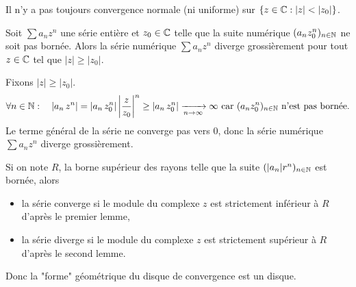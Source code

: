 \documentclass{book}
\begin{document}
\begin{Remarque} Il n'y a pas toujours convergence normale (ni uniforme) sur $\{z\in \C:|z|<|z_0|\}$.
\end{Remarque}
\begin{Lemme}
Soit $\sum a_n z^n$ une série entière et $z_0\in \mathbb{C}$ telle que la suite numérique $(a_n z_0^n)_{n\in \mathbb{N} }$ ne soit pas bornée.
Alors la série numérique $\sum a_n z^n$ diverge grossièrement pour tout $z\in \mathbb{C}$ tel que $|z| \geq |z_0|$.
\end{Lemme}
\begin{Demonstration}
Fixons $|z|\geq  |z_{0}|$.\\
$$ \forall n\in \mathbb{N}: \quad |a_{n}\,z^{n}|=\left|a_{n}\,z_{0}^{n}\right|\left|\frac {z}{z_{0}}\right|^{n}\geq\left|a_{n}\,z_{0}^{n}\right|\xrightarrow[n\to\infty]{}\infty\text{ car }(a_n z_0^n)_{n\in \mathbb{N} }\text{ n'est pas bornée}.$$
Le terme général de la série ne converge  pas vers 0, donc la série numérique $\sum a_n z^n$ diverge grossièrement.
\end{Demonstration}
Si on note $R$, la borne supérieur des rayons telle que la suite $(|a_n| r^n)_{n\in\mathbb{N}}$ est bornée, alors 
\begin{itemize}
\item la série converge si le module du complexe $z$  est  strictement inférieur à $R$ d'après le premier lemme,
\item la série diverge  si le module du complexe $z$  est  strictement supérieur à $R$ d'après le second lemme.
\end{itemize}
Donc la "forme" géométrique du disque de convergence est un disque.
\end{document}
